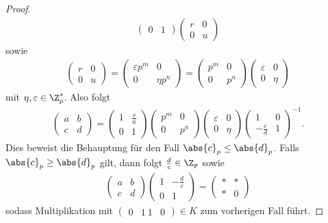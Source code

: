 \begin{proof}
\begin{align*}
\begin{pmatrix}
0&1
\end{pmatrix}
\begin{pmatrix}
r&0\\
0&u
\end{pmatrix}
\end{align*}
sowie
\begin{align*}
\begin{pmatrix}
r&0\\
0&u
\end{pmatrix}=\begin{pmatrix}
\varepsilon p^m&0\\
0&\eta p^n
\end{pmatrix}=
\begin{pmatrix}
p^m&0\\
0&p^n
\end{pmatrix}
\begin{pmatrix}
\varepsilon&0\\
0&\eta
\end{pmatrix}
\end{align*}
mit $\eta,\varepsilon \in \Z_p^\ast$.
Also folgt
\begin{align*}
\begin{pmatrix}
a&b\\
c&d
\end{pmatrix}=\begin{pmatrix}
1&\frac{s}{u}\\
0&1
\end{pmatrix} \begin{pmatrix}
p^m&0\\
0&p^n
\end{pmatrix}\begin{pmatrix}
\varepsilon&0\\
0&\eta
\end{pmatrix}\begin{pmatrix}
1&0\\
-\frac{c}{d}&1
\end{pmatrix}^{-1}.
\end{align*}
Dies beweist die Behauptung für den Fall $\abs{c}_p\leq \abs{d}_p$.
Falls $\abs{c}_p\geq \abs{d}_p$ gilt, dann folgt $\frac{d}{c}\in \Z_p$ sowie
\begin{align*}
\begin{pmatrix}
a&b\\
c&d
\end{pmatrix}
\begin{pmatrix}
1&-\frac{d}{c}\\
0&1
\end{pmatrix}=
\begin{pmatrix}
\ast&\ast\\
\ast&0
\end{pmatrix}
\end{align*}
sodass Multiplikation mit $\begin{pmatrix}
0&1\
1&0
\end{pmatrix}\in K$
zum vorherigen Fall führt.
\end{proof}

